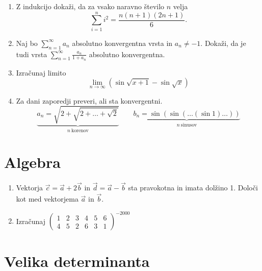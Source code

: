 \documentclass[a4paper,12pt]{article}
\begin{document}
\begin{enumerate}
\item
Z indukcijo dokaži, da za vsako naravno število \(n\) velja
\[\sum_{i=1}^{n}i^2 = \frac{n(n+1)(2n+1)}{6}.\]

\item
Naj bo \(\sum_{n=1}^{\infty} a_n\) absolutno konvergentna vrsta in \(a_n \ne -1\).
Dokaži, da je tudi vrsta \(\sum_{n=1}^\infty \frac{a_n}{1+a_n}\)
absolutno konvergentna.

\item
Izračunaj limito
\[\lim_{n \to \infty} (\sin \sqrt{x+1} - \sin \sqrt{x})\]

\item
Za dani zaporedji preveri, ali sta konvergentni.
\[
\underbrace{a_n = \sqrt{2+\sqrt{2+\dots+\sqrt{2}}}}_{n\ \text{korenov}} \qquad 
\underbrace{b_n = \sin(\sin(\dots(\sin 1)\dots))}_{n\ \text{sinusov}}
\]
\end{enumerate}

\section*{Algebra}

\begin{enumerate}
\item
Vektorja \(\vec{c} = \vec{a} + 2\vec{b}\) in \(\vec{d} = \vec{a} - \vec{b}\)
sta pravokotna in imata dolžino 1. Določi kot med vektorjema \(\vec{a}\) in \(\vec{b}\).

\item
Izračunaj
\(\begin{pmatrix}
    1 & 2 & 3 & 4 & 5 & 6 \\
    4 & 5 & 2 & 6 & 3 & 1
\end{pmatrix}^{-2000}
\)
\end{enumerate}

\section*{Velika determinanta}
\end{document}
